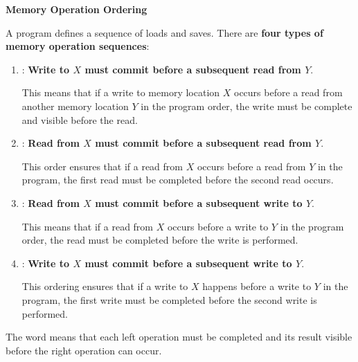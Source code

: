\begin{flushleft}
    \textcolor{Green3}{ \textbf{Memory Operation Ordering}}
\end{flushleft}
A program defines a sequence of loads and saves. There are \textbf{four types of memory operation sequences}:
\begin{enumerate}
    \item {}: \textbf{Write to $X$ must commit before a subsequent read from $Y$}.

    This means that if a write to memory location $X$ occurs before a read from another memory location $Y$ in the program order, the write must be complete and visible before the read.


    \item {}: \textbf{Read from $X$ must commit before a subsequent read from $Y$}.
   
    This order ensures that if a read from $X$ occurs before a read from $Y$ in the program, the first read must be completed before the second read occurs.


    \item {}: \textbf{Read from $X$ must commit before a subsequent write to $Y$}.
   
    This means that if a read from $X$ occurs before a write to $Y$ in the program order, the read must be completed before the write is performed.


    \item {}: \textbf{Write to $X$ must commit before a subsequent write to $Y$}.
   
    This ordering ensures that if a write to $X$ happens before a write to $Y$ in the program, the first write must be completed before the second write is performed.
\end{enumerate}
The word  means that each left operation must be completed and its result visible before the right operation can occur.

